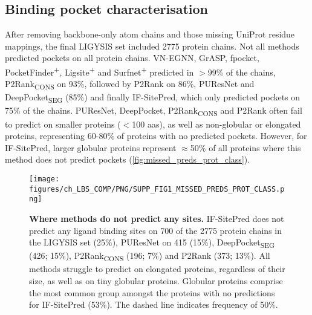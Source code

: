 
\subsection{Binding pocket characterisation}

After removing backbone-only atom chains and those missing UniProt residue mappings, the final LIGYSIS set included 2775 protein chains. Not all methods predicted pockets on all protein chains. VN-EGNN, GrASP, fpocket, PocketFinder\textsuperscript{+}, Ligsite\textsuperscript{+} and Surfnet\textsuperscript{+} predicted in $>$99\% of the chains, P2Rank\textsubscript{CONS} on 93\%, followed by P2Rank on 86\%, PUResNet and DeepPocket\textsubscript{SEG} (85\%) and finally IF-SitePred, which only predicted pockets on 75\% of the chains. PUResNet, DeepPocket, P2Rank\textsubscript{CONS} and P2Rank often fail to predict on smaller proteins ($<$100 aas), as well as non-globular or elongated proteins, representing 60-80\% of proteins with no predicted pockets. However, for IF-SitePred, larger globular proteins represent $\approx$50\% of all proteins where this method does not predict pockets (\autoref{fig:missed_preds_prot_class}).

\begin{figure}[htb!]
    \centering
    \texttt{[image: figures/ch\_LBS\_COMP/PNG/SUPP\_FIG1\_MISSED\_PREDS\_PROT\_CLASS.png]}
    \caption[Where methods do not predict any sites]{\textbf{Where methods do not predict any sites.} IF-SitePred does not predict any ligand binding sites on 700 of the 2775 protein chains in the LIGYSIS set (25\%), PUResNet on 415 (15\%), DeepPocket\textsubscript{SEG} (426; 15\%), P2Rank\textsubscript{CONS} (196; 7\%) and P2Rank (373; 13\%). All methods struggle to predict on elongated proteins, regardless of their size, as well as on tiny globular proteins. Globular proteins comprise the most common group amongst the proteins with no predictions for IF-SitePred (53\%). The dashed line indicates frequency of 50\%.}
    \label{fig:missed_preds_prot_class}
\end{figure}

\newpage

